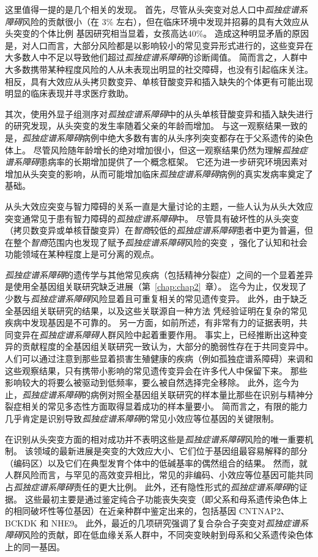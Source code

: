 这里值得一提的是几个相关的发现。
首先，尽管从头突变对总人口中\textit{孤独症谱系障碍}风险的贡献很小（在 3\% 左右），但在临床环境中发现并招募的具有大效应从头突变的个体比例 基因研究相当显着，女孩高达40\%。
造成这种明显矛盾的原因是，对人口而言，大部分风险都是以影响较小的常见变异形式进行的，这些变异在大多数人中不足以导致他们超过\textit{孤独症谱系障碍}的诊断阈值。
简而言之，人群中大多数携带某种程度风险的人从未表现出明显的社交障碍，也没有引起临床关注。
相反，具有大效应从头拷贝数变异、单核苷酸变异和插入缺失的个体更有可能出现明显的临床表现并寻求医疗救助。


其次，使用外显子组测序对\textit{孤独症谱系障碍}中的从头单核苷酸变异和插入缺失进行的研究发现，从头突变的发生率随着父亲的年龄而增加。
与这一观察结果一致的是，\textit{孤独症谱系障碍}病例中绝大多数有害的从头序列突变都存在于父系遗传的染色体上。
尽管风险随年龄增长的绝对增加很小，但这一观察结果仍然为理解\textit{孤独症谱系障碍}患病率的长期增加提供了一个概念框架。
它还为进一步研究环境因素对增加从头突变的影响，从而可能增加临床\textit{孤独症谱系障碍}病例的真实发病率奠定了基础。


从头大效应突变与智力障碍的关系一直是大量讨论的主题，一些人认为从头大效应突变通常见于患有智力障碍的\textit{孤独症谱系障碍}中。
尽管具有破坏性的从头突变（拷贝数变异或单核苷酸变异）在\textit{智商}较低的\textit{孤独症谱系障碍}患者中更为普遍，但在整个\textit{智商}范围内也发现了赋予\textit{孤独症谱系障碍}风险的突变 ，强化了认知和社会功能领域在某种程度上是可分离的观点。


\textit{孤独症谱系障碍}的遗传学与其他常见疾病（包括精神分裂症）之间的一个显着差异是使用全基因组关联研究缺乏进展（第~\ref{chap:chap2}~章）。
迄今为止，仅发现了少数与\textit{孤独症谱系障碍}风险显着且可重复相关的常见遗传变异。
此外，由于缺乏全基因组关联研究的结果，以及这些关联源自一种方法 凭经验证明在复杂的常见疾病中发现基因是不可靠的。
另一方面，如前所述，有非常有力的证据表明，共同变异在\textit{孤独症谱系障碍}人群风险中起着重要作用。
事实上，已经推断出这种变异的贡献程度的全基因组关联研究一致认为，大部分的脆弱性存在于共同变异中。
人们可以通过注意到那些显着损害生殖健康的疾病（例如孤独症谱系障碍）来调和这些观察结果，只有携带小影响的常见遗传变异会在许多代人中保留下来。
那些影响较大的将要么被驱动到低频率，要么被自然选择完全移除。
此外，迄今为止，\textit{孤独症谱系障碍}的病例对照全基因组关联研究的样本量比那些在识别与精神分裂症相关的常见多态性方面取得显着成功的样本量要小。
简而言之，有限的能力几乎肯定是识别导致\textit{孤独症谱系障碍}的常见小效应等位基因的关键限制。


在识别从头突变方面的相对成功并不表明这些是\textit{孤独症谱系障碍}风险的唯一重要机制。
该领域的最新进展是突变的大效应大小、它们位于基因组最容易解释的部分（编码区）以及它们在典型发育个体中的低碱基率的偶然组合的结果。
然而，就人群风险而言，与罕见的高效变异相比，常见的非编码、小效应等位基因可能共同占\textit{孤独症谱系障碍}责任的更大比例。
此外，还有隐性形式的\textit{孤独症谱系障碍}的证据。
这些最初主要是通过鉴定纯合子功能丧失突变（即父系和母系遗传染色体上的相同破坏性等位基因）在近亲种群中鉴定出来的，包括基因 CNTNAP2、BCKDK 和 NHE9。
此外，最近的几项研究强调了复合杂合子突变对\textit{孤独症谱系障碍}风险的贡献，即在低血缘关系人群中，不同突变映射到母系和父系遗传染色体上的同一基因。


